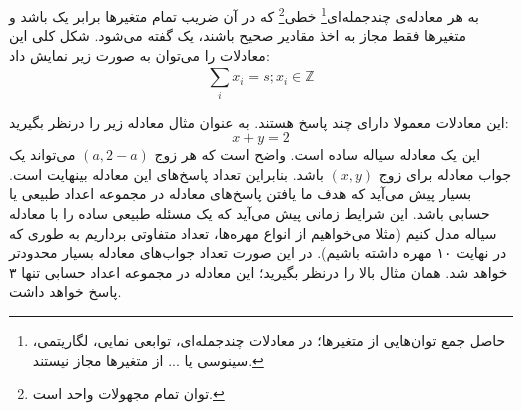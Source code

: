 
\begin{DEFINITION}
    \p
    به هر معادله‌ی چندجمله‌ای\footnote{حاصل جمع توان‌هایی از متغیر‌ها؛ در معادلات چندجمله‌ای،
    توابعی نمایی، لگاریتمی، سینوسی یا ... از متغیر‌ها مجاز نیستند.}
    خطی\footnote{توان تمام مجهولات واحد است.}
    که در آن ضریب تمام متغیر‌ها برابر یک باشد
    و متغیر‌ها فقط مجاز به اخذ مقادیر صحیح باشند،
    یک
    گفته می‌شود.
    شکل کلی این معادلات را می‌توان به صورت زیر نمایش داد:
    $$\sum\limits_{i}^{} {x_i} = s ; x_i \in \mathbb{Z}$$
\end{DEFINITION}

\p
این معادلات معمولا دارای چند پاسخ هستند.
به عنوان مثال معادله زیر را درنظر بگیرید:
$$x + y = 2$$
این یک معادله سیاله ساده است.
واضح است که هر زوج
$(a, 2-a)$
می‌تواند یک جواب معادله برای زوج
$(x,y)$
باشد. بنابراین تعداد پاسخ‌های این معادله بینهایت است.
بسیار پیش می‌آید که هدف ما یافتن پاسخ‌های معادله در مجموعه اعداد طبیعی یا حسابی باشد.
این شرایط زمانی پیش می‌آید که یک مسئله طبیعی ساده را با معادله سیاله مدل کنیم
(مثلا می‌خواهیم از انواع مهره‌ها، تعداد متفاوتی برداریم به طوری که در نهایت ۱۰ مهره داشته باشیم).
در این صورت تعداد جواب‌های معادله بسیار محدود‌تر خواهد شد.
همان مثال بالا را درنظر بگیرید؛ این معادله در مجموعه اعداد حسابی تنها ۳ پاسخ خواهد داشت.






